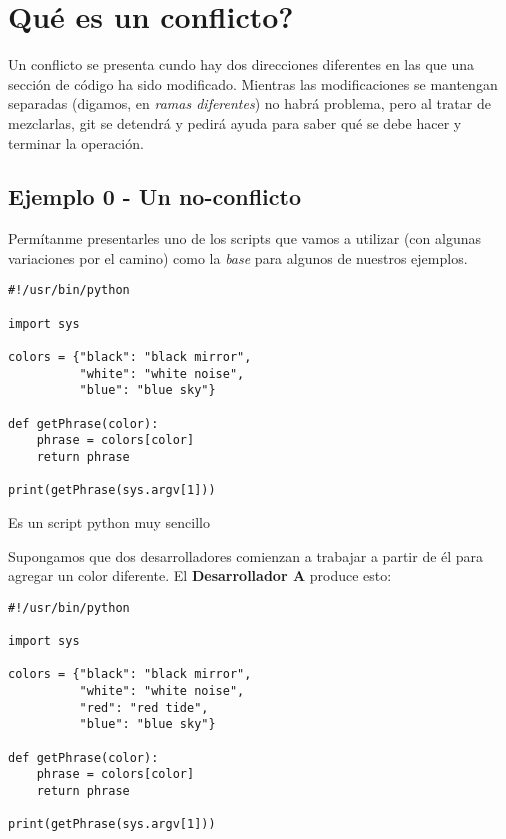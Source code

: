 
\section{Qué es un conflicto?}

Un conflicto se presenta cundo hay dos direcciones diferentes en las que una sección de código ha sido modificado. Mientras las
modificaciones se mantengan separadas (digamos, en {\it ramas diferentes}) no habrá problema, pero al tratar de mezclarlas, git se detendrá
y pedirá ayuda para saber qué se debe hacer y terminar la operación.

\subsection{Ejemplo 0 - Un no-conflicto}
\label{example_00}

Permítanme presentarles uno de los scripts que vamos a utilizar (con algunas variaciones por el camino) como la {\it base} para
algunos de nuestros ejemplos.

\begin{lstlisting}[style=python_style, caption={\bf Ejemplo 0} - ancestro común]
#!/usr/bin/python

import sys

colors = {"black": "black mirror",
          "white": "white noise",
          "blue": "blue sky"}

def getPhrase(color):
    phrase = colors[color]
    return phrase

print(getPhrase(sys.argv[1]))
\end{lstlisting}

Es un script python muy sencillo

Supongamos que dos desarrolladores comienzan a trabajar a partir de él para agregar un color diferente. El {\bf Desarrollador A}
produce esto:

\begin{lstlisting}[style=python_style, caption={\bf Ejemplo 0} - Desarrollador A]
#!/usr/bin/python

import sys

colors = {"black": "black mirror",
          "white": "white noise",
          "red": "red tide",
          "blue": "blue sky"}

def getPhrase(color):
    phrase = colors[color]
    return phrase

print(getPhrase(sys.argv[1]))
\end{lstlisting}

